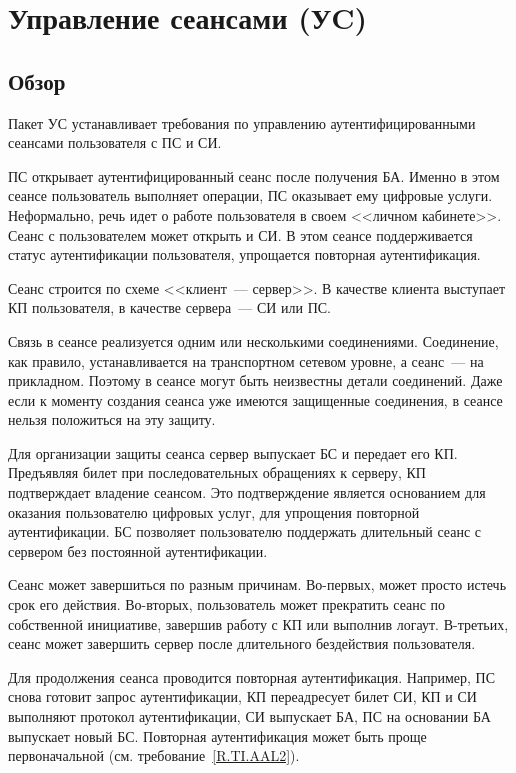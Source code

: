 \section{Управление сеансами (УC)}\label{SM}

\subsection{Обзор}\label{SM.Intro}

Пакет УС устанавливает требования по управлению аутентифицированными сеансами 
пользователя с ПС и СИ.

ПС открывает аутентифицированный сеанс после получения БА. Именно в этом сеансе 
пользователь выполняет операции, ПС оказывает ему цифровые услуги. Неформально, 
речь идет о работе пользователя в своем <<личном кабинете>>.
%
Сеанс с пользователем может открыть и СИ. В этом сеансе поддерживается статус
аутентификации пользователя, упрощается повторная аутентификация.

Сеанс строится по схеме <<клиент~--- сервер>>. В качестве клиента выступает КП
пользователя, в качестве сервера~--- СИ или ПС.

Связь в сеансе реализуется одним или несколькими соединениями. 
%
Соединение, как правило, устанавливается на транспортном 
сетевом уровне, а сеанс~--- на прикладном. Поэтому в сеансе могут
быть неизвестны детали соединений.
%
Даже если к моменту создания сеанса уже имеются защищенные соединения,
в сеансе нельзя положиться на эту защиту.

Для организации защиты сеанса сервер выпускает БС и передает его КП. 
Предъявляя билет при последовательных обращениях к серверу,
КП подтверждает владение сеансом. Это подтверждение является основанием
для оказания пользователю цифровых услуг, для упрощения повторной 
аутентификации. БС позволяет пользователю поддержать длительный 
сеанс с сервером без постоянной аутентификации.  

Сеанс может завершиться по разным причинам. Во-первых, может просто истечь
срок его действия. Во-вторых, пользователь может прекратить сеанс по 
собственной инициативе, завершив работу с КП или выполнив логаут. В-третьих, 
сеанс может завершить сервер после длительного бездействия пользователя. 

Для продолжения сеанса проводится повторная аутентификация.
Например, ПС снова готовит запрос аутентификации, КП переадресует билет 
СИ, КП и СИ выполняют протокол аутентификации, СИ выпускает БА,
ПС на основании БА выпускает новый БС.
%
Повторная аутентификация может быть проще первоначальной
(см. требование~\ref{R.TI.AAL2}).
%

